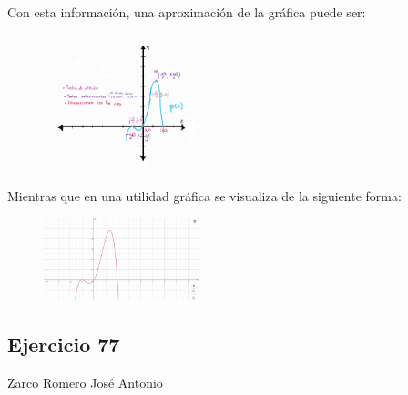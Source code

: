 \documentclass[12pt]{article}
\begin{document}
  Con esta información, una aproximación de la gráfica puede ser:
  \begin{figure}[H]
\centering
\includegraphics[width=0.4\textwidth]{../img/img_Lista3/grafica55.png}
  \end{figure}
  Mientras que en una utilidad gráfica se visualiza de la siguiente forma:
  \begin{figure}[H]
\centering
\includegraphics[width=0.4\textwidth]{../img/img_Lista3/grafica255.png}
  \end{figure}
\subsection{Ejercicio 77} Zarco Romero José Antonio \\
\end{document}
